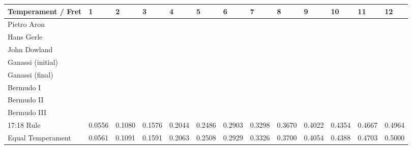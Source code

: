 \begin{sidewaystable}[htdp]
\tiny
\begin{center}
\begin{tabular}{| l || l | l | l | l | l | l | l | l | l | l | l | l |}
\hline
\textbf{Temperament / Fret} & \textbf{1} & \textbf{2} & \textbf{3} & \textbf{4} & \textbf{5} & \textbf{6} & \textbf{7} & \textbf{8} & \textbf{9} & \textbf{10} & \textbf{11} & \textbf{12} \\
\hline
Pietro Aron \\
\hline
Hans Gerle \\
\hline
John Dowland \\
\hline
Ganassi (initial)  \\
\hline
Ganassi (final)  \\
\hline
Bermudo I \\
\hline
Bermudo II \\
\hline
Bermudo III \\
\hline
17:18 Rule & 0.0556 & 0.1080 & 0.1576 & 0.2044 & 0.2486 & 0.2903 & 0.3298 & 0.3670 & 0.4022 & 0.4354 & 0.4667 & 0.4964 \\
\hline
Equal Temperament & 0.0561 & 0.1091 & 0.1591 & 0.2063 & 0.2508 & 0.2929 & 0.3326 & 0.3700 & 0.4054 & 0.4388 & 0.4703 & 0.5000 \\
\hline
\end{tabular}
\end{center}
\end{sidewaystable}
